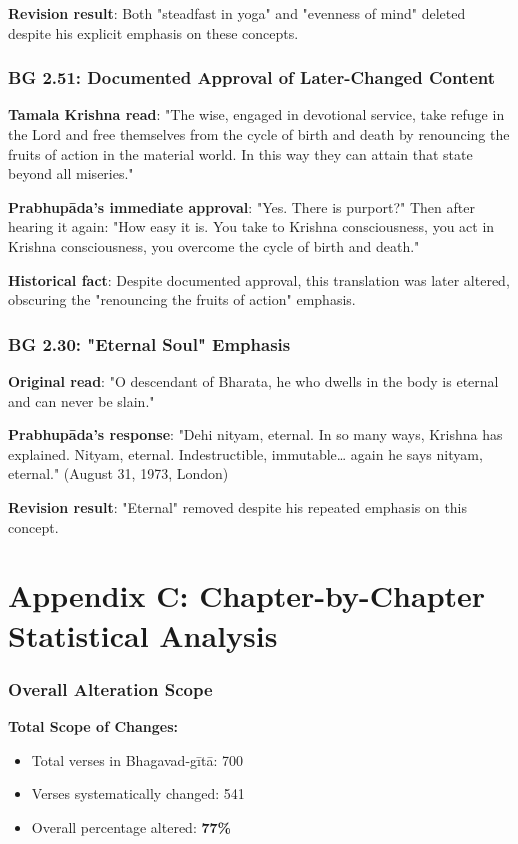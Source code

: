 \documentclass[11pt,twoside]{book}
\begin{document}
\textbf{\textbf{Revision result}}: Both "steadfast in yoga" and "evenness of mind" deleted despite his explicit emphasis on these concepts.
\section*{BG 2.51: Documented Approval of Later-Changed Content}
\label{sec:org293ecad}
\textbf{\textbf{Tamala Krishna read}}: "The wise, engaged in devotional service, take refuge in the Lord and free themselves from the cycle of birth and death by renouncing the fruits of action in the material world. In this way they can attain that state beyond all miseries."

\textbf{\textbf{Prabhupāda's immediate approval}}: "Yes. There is purport?" Then after hearing it again: "How easy it is. You take to Krishna consciousness, you act in Krishna consciousness, you overcome the cycle of birth and death."

\textbf{\textbf{Historical fact}}: Despite documented approval, this translation was later altered, obscuring the "renouncing the fruits of action" emphasis.
\section*{BG 2.30: "Eternal Soul" Emphasis}
\label{sec:org62325c9}
\textbf{\textbf{Original read}}: "O descendant of Bharata, he who dwells in the body is eternal and can never be slain."

\textbf{\textbf{Prabhupāda's response}}: "Dehi nityam, eternal. In so many ways, Krishna has explained. Nityam, eternal. Indestructible, immutable\ldots{} again he says nityam, eternal." (August 31, 1973, London)

\textbf{\textbf{Revision result}}: "Eternal" removed despite his repeated emphasis on this concept.
\part*{Appendix C: Chapter-by-Chapter Statistical Analysis}
\label{sec:org72c6a09}
\thispagestyle{plain}
\section*{Overall Alteration Scope}
\label{sec:orgba62e2a}

\textbf{\textbf{Total Scope of Changes:}}
\begin{itemize}
\item Total verses in Bhagavad-gītā: 700
\item Verses systematically changed: 541
\item Overall percentage altered: \textbf{\textbf{77\%}}
\end{itemize}
\end{document}
